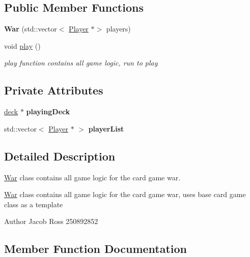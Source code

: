 \subsection*{Public Member Functions}
\begin{DoxyCompactItemize}
\item 
\mbox{\label{classWar_a354b86ad426e3e5323d3d642e5bedc99}} 
{\bfseries War} (std\+::vector$<$ \hyperlink{classPlayer}{Player} $\ast$$>$ players)
\item 
void \hyperlink{classWar_a507414bb7608a837b7b884827795de81}{play} ()
\begin{DoxyCompactList}\small\item\em play function contains all game logic, run to play \end{DoxyCompactList}\end{DoxyCompactItemize}
\subsection*{Private Attributes}
\begin{DoxyCompactItemize}
\item 
\mbox{\label{classWar_aba0ff3d35af3cb6fdfcc30ca98e84c6e}} 
\hyperlink{classdeck}{deck} $\ast$ {\bfseries playing\+Deck}
\item 
\mbox{\label{classWar_add456d46ce43425c60b21b06c1e6706a}} 
std\+::vector$<$ \hyperlink{classPlayer}{Player} $\ast$ $>$ {\bfseries player\+List}
\end{DoxyCompactItemize}


\subsection{Detailed Description}
\hyperlink{classWar}{War} class contains all game logic for the card game war. 

\hyperlink{classWar}{War} class contains all game logic for the card game war, uses base card game class as a template \begin{DoxyAuthor}{Author}
Jacob Ross 250892852 
\end{DoxyAuthor}


\subsection{Member Function Documentation}
\mbox{\label{classWar_a507414bb7608a837b7b884827795de81}} 

